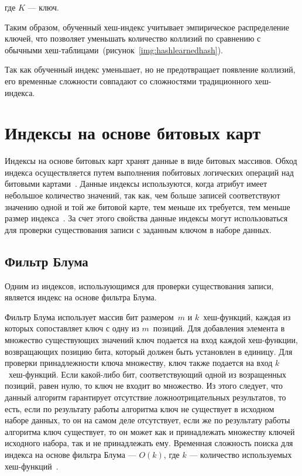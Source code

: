 где $K$ --- ключ.

Таким образом, обученный хеш-индекс учитывает эмпирическое распределение ключей,
что позволяет уменьшать количество коллизий по сравнению с обычными
хеш-таблицами~(рисунок~\ref{img:hashlearnedhash}).


Так как обученный индекс уменьшает, но не предотвращает появление коллизий, его
временные сложности совпадают со сложностями традиционного хеш-индекса.

\section{Индексы на основе битовых карт}

Индексы на основе битовых карт хранят данные в виде битовых массивов. Обход
индекса осуществляется путем выполнения побитовых логических операций над
битовыми картами~\cite{loshad}. Данные индексы используются, когда атрибут
имеет небольшое количество значений, так как, чем больше записей соответствуют
значению одной и той же битовой карте, тем меньше их требуется, тем меньше
размер индекса~\cite{marvel}. За счет этого свойства данные индексы могут
использоваться для проверки существования записи с заданным ключом в наборе
данных.

\subsection{Фильтр Блума}

Одним из индексов, использующимся для проверки существования записи, является
индекс на основе фильтра Блума.

Фильтр Блума использует массив бит размером~$m$ и $k$~хеш-функций, каждая из
которых сопоставляет ключ с одну из $m$~позиций. Для добавления элемента в
множество существующих значений ключ подается на вход каждой хеш-функции,
возвращающих позицию бита, который должен быть установлен в единицу. Для
проверки принадлежности ключа множеству, ключ также подается на вход
$k$~хеш-функций.  Если какой-либо бит, соответствующий одной из возращенных
позиций, равен нулю, то ключ не входит во множество. Из этого следует, что
данный алгоритм гарантирует отсутствие ложноотрицательных результатов, то есть,
если по результату работы алгоритма ключ не существует в исходном наборе данных,
то он на самом деле отсутствует, если же по результату работы алгоритма ключ
существует, то он может как и принадлежать множеству ключей исходного набора,
так и не принадлежать ему. Временная сложность поиска для индекса на основе
фильтра Блума --- $O(k)$, где $k$ --- количество используемых
хеш-функций~\cite{ship}.

